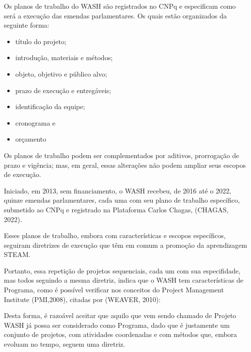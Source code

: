 Os planos de trabalho do WASH são registrados no CNPq e especificam como será a execução das emendas parlamentares. Os quais estão organizados da seguinte forma:


\begin{itemize}
\item título do projeto;
\item introdução, materiais e métodos;
\item objeto, objetivo e público alvo;
\item prazo de execução e entregáveis;
\item identificação da equipe;
\item cronograma e
\item orçamento

\end{itemize}

Os planos de trabalho podem ser complementados por aditivos, prorrogação de prazo e vigência; mas, em geral, essas alterações não podem ampliar seus escopos de execução.

Iniciado, em 2013, sem financiamento, o WASH recebeu, de 2016 até o 2022, quinze emendas parlamentares, cada uma com seu plano de trabalho específico, submetido ao CNPq e registrado na Plataforma Carlos Chagas, (CHAGAS, 2022).

Esses planos de trabalho, embora com características e escopos específicos, seguiram diretrizes de execução que têm em comum a promoção da aprendizagem STEAM.

Portanto, essa repetição de projetos sequenciais, cada um com sua especifidade, mas todos seguindo a mesma diretriz, indica que o WASH tem características de Programa, como é possível verificar nos conceitos do Project Management Institute  (PMI,2008), citadas por  (WEAVER, 2010):


\noindent\begin{flushright}\mbox{\linespread{1}\selectfont\centering{}}\end{flushright}


Desta forma, é razoável aceitar que aquilo que vem sendo chamado de Projeto WASH já possa ser considerado como Programa, dado que é justamente um conjunto de projetos, com atividades coordenadas e com métodos que, embora evoluam no tempo, seguem uma diretriz.

